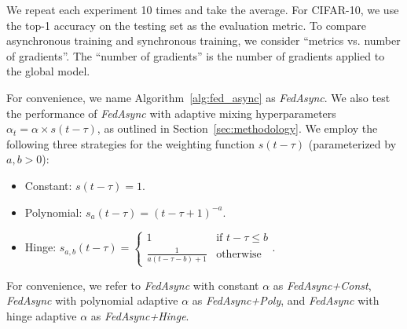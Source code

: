 \documentclass{opt2020} %
\begin{document}
We repeat each experiment 10 times and take the average. For CIFAR-10, we use the top-1 accuracy on the testing set as the evaluation metric.
To compare asynchronous training and synchronous training, we consider ``metrics vs. number of gradients''.
The ``number of gradients'' is the number of gradients applied to the global model.


For convenience, we name Algorithm~\ref{alg:fed_async} as \textit{FedAsync}. We also test the performance of \textit{FedAsync} with adaptive mixing hyperparameters $\alpha_t = \alpha \times s(t-\tau)$, as outlined in Section~\ref{sec:methodology}. We employ the following three strategies for the weighting function $s(t - \tau)$ (parameterized by $a,b>0$):
\noindent
\begin{minipage}[t]{0.41\textwidth}
\begin{itemize}[topsep=2pt,itemsep=0pt,partopsep=0pt,parsep=0pt]
\item Constant: $s(t-\tau) = 1$.
\item Polynomial: $s_a(t-\tau) = (t-\tau+1)^{-a}$.
\end{itemize}
\end{minipage}
\hfill
\begin{minipage}[t]{0.58\textwidth}
\begin{itemize}[topsep=2pt,itemsep=0pt,partopsep=0pt,parsep=0pt]
\item Hinge:
$
s_{a,b}(t-\tau) =
\begin{cases}
1 & \mbox{if $t-\tau \leq b$}\\
\frac{1}{a(t-\tau-b)+1} & \mbox{otherwise}
\end{cases}.
$
\end{itemize}
\end{minipage}

For convenience, we refer to \textit{FedAsync} with constant $\alpha$ as \textit{FedAsync+Const}, \textit{FedAsync} with polynomial adaptive $\alpha$ as \textit{FedAsync+Poly}, and \textit{FedAsync} with hinge adaptive $\alpha$ as \textit{FedAsync+Hinge}.


\end{document}
